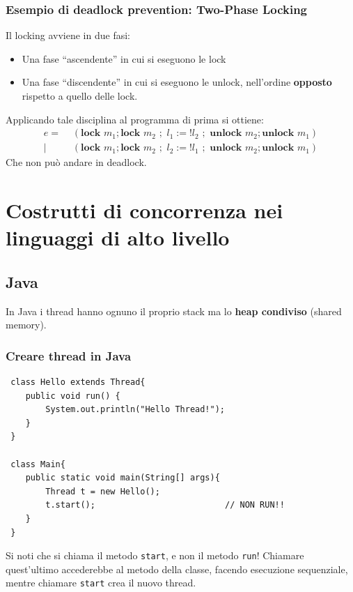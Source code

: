 \documentclass[a4paper,10pt]{article}
\begin{document}
\subsubsection{Esempio di deadlock prevention: Two-Phase Locking}

Il locking avviene in due fasi: 

\begin{itemize}
 \item Una fase ``ascendente'' in cui si eseguono le lock 
 \item Una fase ``discendente'' in cui si eseguono le unlock, nell'ordine \textbf{opposto} rispetto a quello delle lock.
\end{itemize}

Applicando tale disciplina al programma di prima si ottiene:
\[\begin{aligned}
e =&\,\,  (\textbf{lock }m_1;\textbf{lock }m_2\,\,;\,\, l_1 := !l_2 \,\,;\,\, \textbf{unlock }m_2; \textbf{unlock }m_1) \\
 |&\,\, (\textbf{lock }m_1;\textbf{lock }m_2\,\,;\,\, l_2 := !l_1 \,\,;\,\, \textbf{unlock }m_2; \textbf{unlock }m_1) 
\end{aligned}\]
Che non può andare in deadlock.

\newpage

\section{Costrutti di concorrenza nei linguaggi di alto livello}

\subsection{Java}
In Java i thread hanno ognuno il proprio stack ma lo \textbf{heap condiviso} (shared memory).

\subsubsection{Creare thread in Java}

\begin{lstlisting}
 class Hello extends Thread{
    public void run() {
        System.out.println("Hello Thread!");
    }
 }
 
 class Main{
    public static void main(String[] args){
        Thread t = new Hello();
        t.start();                          // NON RUN!!
    }
 }
\end{lstlisting}
 Si noti che si chiama il metodo \texttt{start}, e non il metodo \texttt{run}! Chiamare quest'ultimo accederebbe al metodo della classe, facendo esecuzione sequenziale, mentre chiamare \texttt{start} crea il nuovo thread.\smallskip
 
\end{document}
